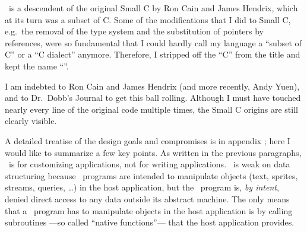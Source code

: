 %

  
\Small\ is a descendent of the original Small C by Ron Cain and James Hendrix,
which at its turn was a subset of C. Some of the modifications that I did to
Small C, e.g.\ the removal of the type system and the substitution of pointers
by references, were so fundamental that I could hardly call my language a
``subset of C'' or a ``C dialect'' anymore. Therefore, I stripped off the ``C''
from the title and kept the name ``\Small''.

I am indebted to Ron Cain and James Hendrix (and more recently, Andy Yuen),
and to Dr.~Dobb's Journal to get this ball rolling. Although I must have
touched nearly every line of the original code multiple times, the Small C
origins are still clearly visible.

\dingbatseparator

A detailed treatise of the design goals and compromises is in appendix
; here I would like to summarize a few key points.
As written in the previous paragraphs, \Small\ is for customizing applications,
not for writing applications. \Small\ is weak on data structuring because
\Small\ programs are intended to manipulate objects (text, sprites, streams, queries,
\dots) in the host application, but the \Small\ program is, {\it by intent},
denied direct access to any data outside its abstract machine. The only means
that a \Small\ program has to manipulate objects in the host application is by
calling subroutines ---so called ``native functions''--- that the host
application provides.

